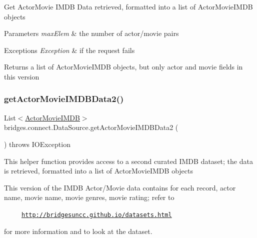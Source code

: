 Get Actor\+Movie I\+M\+DB Data retrieved, formatted into a list of Actor\+Movie\+I\+M\+DB objects


\begin{DoxyParams}{Parameters}
{\em max\+Elem} & the number of actor/movie pairs \\
\hline
\end{DoxyParams}

\begin{DoxyExceptions}{Exceptions}
{\em Exception} & if the request fails\\
\hline
\end{DoxyExceptions}
\begin{DoxyReturn}{Returns}
a list of Actor\+Movie\+I\+M\+DB objects, but only actor and movie fields in this version 
\end{DoxyReturn}
\mbox{\label{classbridges_1_1connect_1_1_data_source_ae44e4ed7879e2755f8c66a335d8b6ad5}} 
\subsubsection{\texorpdfstring{get\+Actor\+Movie\+I\+M\+D\+B\+Data2()}{getActorMovieIMDBData2()}}
{\footnotesize\ttfamily List$<$\hyperlink{classbridges_1_1data__src__dependent_1_1_actor_movie_i_m_d_b}{Actor\+Movie\+I\+M\+DB}$>$ bridges.\+connect.\+Data\+Source.\+get\+Actor\+Movie\+I\+M\+D\+B\+Data2 (\begin{DoxyParamCaption}{ }\end{DoxyParamCaption}) throws I\+O\+Exception}

This helper function provides access to a second curated I\+M\+DB dataset; the data is retrieved, formatted into a list of Actor\+Movie\+I\+M\+DB objects

This version of the I\+M\+DB Actor/\+Movie data contains for each record, actor name, movie name, movie genres, movie rating; refer to 

~~~~~\href{http://bridgesuncc.github.io/datasets.html}{\tt http\+://bridgesuncc.\+github.\+io/datasets.\+html} 

for more information and to look at the dataset.


